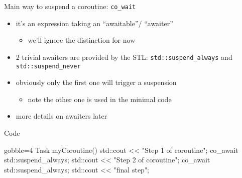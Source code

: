 \begin{frame}[fragile]
  \begin{block}{Main way to suspend a coroutine: \texttt{co_wait}}
    \begin{itemize}
    \item it's an expression taking an ``awaitable''/ ``awaiter''
      \begin{itemize}
      \item we'll ignore the distinction for now
      \end{itemize}
    \item 2 trivial awaiters are provided by the STL: \texttt{std::suspend_always} and \texttt{std::suspend_never}
    \item obviously only the first one will trigger a suspension
      \begin{itemize}
      \item note the other one is used in the minimal code
      \end{itemize}
    \item more details on awaiters later
    \end{itemize}
  \end{block}
  \begin{exampleblock}{Code}
    {\scriptsize
      \begin{cppcode*}{gobble=4}
        Task myCoroutine() {
          std::cout << "Step 1 of coroutine\n";
          co_await std::suspend_always{};
          std::cout << "Step 2 of coroutine\n";
          co_await std::suspend_always{};
          std::cout << "final step\n";
        }
      \end{cppcode*}
    }
  \end{exampleblock}
\end{frame}

